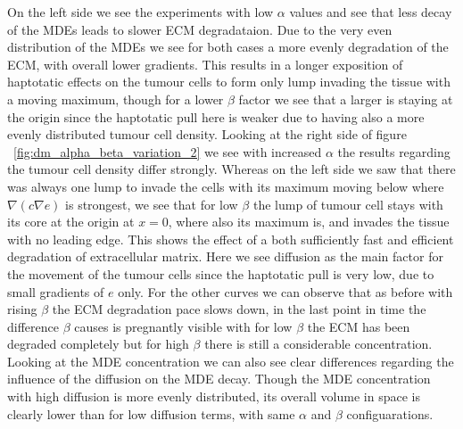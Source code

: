 On the left side we see the experiments with low $\alpha$ values and see that less decay of the MDEs leads to slower ECM degradataion. Due to the very even distribution of the MDEs we see for both cases a more evenly degradation of the ECM, with overall lower gradients. This results in a longer exposition of haptotatic effects on the tumour cells to form only lump invading the tissue with a moving maximum, though for a lower $\beta$ factor we see that a larger is staying at the origin since the haptotatic pull here is weaker due to having also a more evenly distributed tumour cell density.\newline 
Looking at the right side of figure ~\ref{fig:dm_alpha_beta_variation_2} we see with increased $\alpha$ the results regarding the tumour cell density differ strongly. Whereas on the left side we saw that there was always one lump to invade the cells with its maximum moving below where $\nabla(c\nabla e)$ is strongest, we see that for low $\beta$ the lump of tumour cell stays with its core at the origin at $x=0$, where also its maximum is, and invades the tissue with no leading edge. This shows the effect of a both sufficiently fast and efficient degradation of extracellular matrix. Here we see diffusion as the main factor for the movement of the tumour cells since the haptotatic pull is very low, due to small gradients of $e$ only. For the other curves we can observe that as before with rising $\beta$ the ECM degradation pace slows down, in the last point in time the difference $\beta$ causes is pregnantly visible with for low $\beta$ the ECM has been degraded completely but for high $\beta$ there is still a considerable concentration. Looking at the MDE concentration we can also see clear differences regarding the influence of the diffusion on the MDE decay. Though the MDE concentration with high diffusion is more evenly distributed, its overall volume in space is clearly lower than for low diffusion terms, with same $\alpha$ and $\beta$ configuarations.



